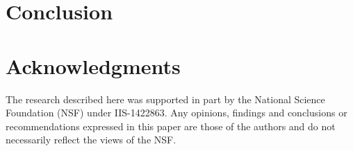 \documentclass[11pt]{article}
\begin{document}
\section{Conclusion}


\section{Acknowledgments}

The research described here was supported in part by the National Science 
Foundation (NSF) under IIS-1422863. Any opinions, findings and conclusions or 
recommendations expressed in this paper are those of the authors and do not 
necessarily reflect the views of the NSF. 


 

\end{document}
